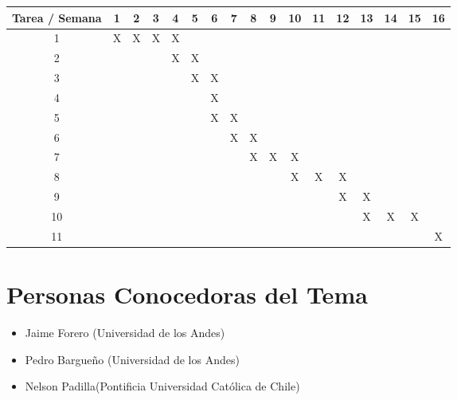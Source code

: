 \documentclass{article}
\begin{document}
\begin{table}[h]

\begin{tabular}{|c||c|c|c|c|c|c|c|c|c|c|c|c|c|c|c|c|}

\hline
Tarea / Semana & 1 & 2 & 3 & 4 & 5 & 6 & 7 & 8 & 9 & 10 & 11 & 12 & 13 & 14 & 15 & 16  \\
\hline\hline
1 & X & X & X & X &   &   &   &   &   &   &   &   &   &   &   &  \\
\hline
2 &   &  &  & X & X &   &   &   &   &   &   &   &   &   &   &  \\
\hline
3 &   &   &   &   & X & X &  &   &   &   &   &   &   &   &   &  \\
\hline
4 &   &   &   &   &   & X &  &  &   &   &   &   &   &   &   &  \\
\hline
5 &   &   &   &   &   & X & X &  &  &   &   &   &   &   &   &  \\
\hline
6 &   &   &   &   &   &   & X & X &   &   &   &   &   &   &   &  \\
\hline
7 &   &   &   &   &   &   &  & X & X & X &  &  &  &   &   &  \\
\hline
8 &   &   &   &   &   &   &   &   &   & X & X & X &  &   &   &  \\
\hline
9 &   &   &   &   &   &   &   &   &   &   &   & X & X &  &  &  \\
\hline
10 &   &   &   &   &   &   &   &   &   &   &   &   & X & X & X & \\
\hline
11 &   &   &   &   &   &   &   &   &   &   &   &   &   &   &  & X\\
\hline


\end{tabular}

\end{table}

\section{Personas Conocedoras del Tema}

\begin{itemize}

\item Jaime Forero (Universidad de los Andes)
\item Pedro Bargueño (Universidad de los Andes)
\item Nelson Padilla(Pontificia Universidad Católica de Chile)

\end{itemize}
\end{document}
